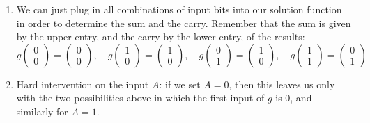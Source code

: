 \begin{enumerate}
\begin{gradedsolution}
\begin{enumerate}
\begin{equation}
        = \begin{pmatrix} a \oplus b \\ a \wedge b\end{pmatrix},
        \label{eq:string_of_equations}
      \end{equation}
      which forces the equalities $g_S \begin{pmatrix} a \\ b\end{pmatrix} = a \oplus b$ and $g_C \begin{pmatrix} a \\ b\end{pmatrix} = a \wedge b$.
      This shows uniqueness, and by construction, this is indeed a valid solution function.
      \item {} We can just plug in all combinations of input bits into our solution function in order to determine the sum and the carry. Remember that the sum is given by the upper entry, and the carry by the lower entry, of the results:
      \begin{equation}
        g \begin{pmatrix} 0 \\ 0\end{pmatrix} = \begin{pmatrix} 0 \\ 0\end{pmatrix}, \quad
        g  \begin{pmatrix} 1 \\ 0\end{pmatrix} = \begin{pmatrix} 1 \\ 0\end{pmatrix}, \quad
        g  \begin{pmatrix} 0 \\ 1\end{pmatrix} = \begin{pmatrix} 1 \\ 0\end{pmatrix}, \quad
        g \begin{pmatrix} 1 \\ 1\end{pmatrix} = \begin{pmatrix} 0 \\ 1\end{pmatrix}
        \label{eq:sums_and_carries}
      \end{equation}
      \item {} Hard intervention on the input $A$: if we set $A = 0$, then this leaves us only with the two possibilities above in which the first input of $g$ is $0$, and similarly for $A = 1$.

\end{enumerate}
\end{gradedsolution}
\end{enumerate}
